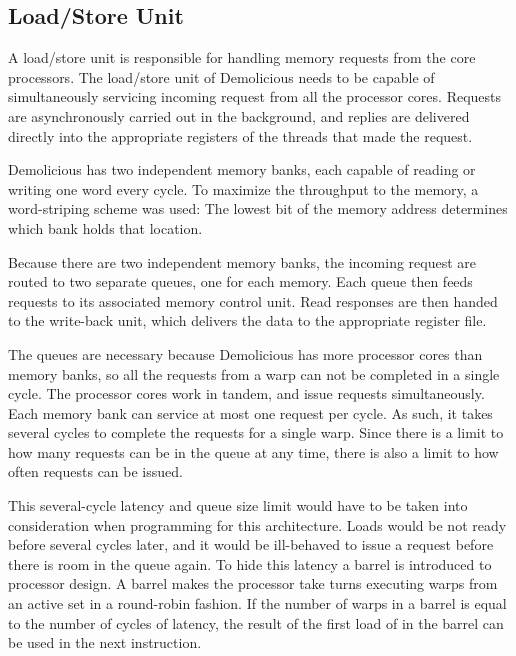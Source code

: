 \subsection{Load/Store Unit}
A load/store unit is responsible for handling memory requests from the core processors.
The load/store unit of Demolicious needs to be capable of simultaneously servicing incoming request from all the processor cores.
Requests are asynchronously carried out in the background, and replies are delivered directly into the appropriate registers of the threads that made the request.

Demolicious has two independent memory banks, each capable of reading or writing one word every cycle.
To maximize the throughput to the memory, a word-striping scheme was used:
The lowest bit of the memory address determines which bank holds that location.

Because there are two independent memory banks, the incoming request are routed to two separate queues, one for each memory.
Each queue then feeds requests to its associated memory control unit.
Read responses are then handed to the write-back unit, which delivers the data to the appropriate register file.

The queues are necessary because Demolicious has more processor cores than memory banks, so all the requests from a warp can not be completed in a single cycle.
The processor cores work in tandem, and issue requests simultaneously.
Each memory bank can service at most one request per cycle.
As such, it takes several cycles to complete the requests for a single warp.
Since there is a limit to how many requests can be in the queue at any time, there is also a limit to how often requests can be issued.

This several-cycle latency and queue size limit would have to be taken into consideration when programming for this architecture.
Loads would be not ready before several cycles later, and it would be ill-behaved to issue a request before there is room in the queue again.
To hide this latency a barrel is introduced to processor design.
A barrel makes the processor take turns executing warps from an active set in a round-robin fashion.
If the number of warps in a barrel is equal to the number of cycles of latency, the result of the first load of in the barrel can be used in the next instruction.
